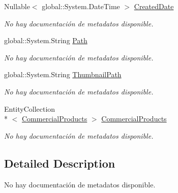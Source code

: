 \begin{DoxyCompactItemize}
Nullable$<$ global\-::\-System.\-Date\-Time $>$ \hyperlink{class_game_memory_1_1_product_images_a6e7dbbf06a198f98bdedd9d6a2f1522a}{Created\-Date}
\begin{DoxyCompactList}\small\item\em No hay documentación de metadatos disponible. \end{DoxyCompactList}\item 
global\-::\-System.\-String \hyperlink{class_game_memory_1_1_product_images_aefd90f7ad4877c35455246a5960d3376}{Path}
\begin{DoxyCompactList}\small\item\em No hay documentación de metadatos disponible. \end{DoxyCompactList}\item 
global\-::\-System.\-String \hyperlink{class_game_memory_1_1_product_images_a75804dbec1120967e319c7b68fa871c5}{Thumbnail\-Path}
\begin{DoxyCompactList}\small\item\em No hay documentación de metadatos disponible. \end{DoxyCompactList}\item 
Entity\-Collection\\*
$<$ \hyperlink{class_game_memory_1_1_commercial_products}{Commercial\-Products} $>$ \hyperlink{class_game_memory_1_1_product_images_a24dde10ce929840666d5e7cfc9c2ecef}{Commercial\-Products}
\begin{DoxyCompactList}\small\item\em No hay documentación de metadatos disponible. \end{DoxyCompactList}\end{DoxyCompactItemize}


\subsection{Detailed Description}
No hay documentación de metadatos disponible. 




